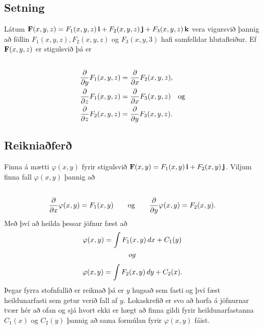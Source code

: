 \documentclass[a4paper,10pt,icelandic]{sphinxmanual}
\begin{document}
\subsection{Setning}
\label{Kafli5:id4}
Látum
\(\mbox{${\bf F}$}(x,y,z)=F_1(x,y,z)\,\mbox{${\bf i}$}+F_2(x,y,z)\,\mbox{${\bf j}$}+F_3(x,y,z)\,\mbox{${\bf k}$}\)
vera vigursvið þannig að föllin \(F_1(x,y,z), F_2(x,y,z)\) og
\(F_3(x,y,3)\) hafi samfelldar hlutafleiður. Ef
\(\mbox{${\bf F}$}(x,y,z)\) er stigulsvið þá er
\begin{gather}
\begin{split}\displaystyle\end{split}\notag\\\begin{split}\begin{aligned}
\frac{\partial}{\partial y}F_1(x,y,z) &=
\frac{\partial}{\partial x}F_2(x,y,z), \\
\frac{\partial}{\partial z}F_1(x,y,z) &=
\frac{\partial}{\partial x}F_3(x,y,z) \quad \text{og} \\
\frac{\partial}{\partial z}F_2(x,y,z)&=
\frac{\partial}{\partial y}F_3(x,y,z).\end{aligned}\end{split}\notag
\end{gather}

\subsection{Reikniaðferð}
\label{Kafli5:reikniafer}
Finna á mætti \(\varphi(x,y)\) fyrir stigulsvið
\(\mbox{${\bf F}$}(x,y)=F_1(x,y)\,\mbox{${\bf i}$}+F_2(x,y)\,\mbox{${\bf j}$}\).
Viljum finna fall \(\varphi(x,y)\) þannig að
\begin{gather}
\begin{split}\displaystyle\end{split}\notag\\\begin{split}\frac{\partial}{\partial x}\varphi(x,y)=F_1(x,y)\qquad
\mbox{og}\qquad \frac{\partial}{\partial y}\varphi(x,y)=F_2(x,y).\end{split}\notag
\end{gather}
Með því að heilda þessar jöfnur fæst að
\begin{gather}
\begin{split}\displaystyle \varphi(x,y)=\int F_1(x,y)\,dx+C_1(y)\end{split}\notag\\\begin{split}og\end{split}\notag
\end{gather}\begin{gather}
\begin{split}\displaystyle \varphi(x,y)=\int F_2(x,y)\,dy+C_2(x).\end{split}\notag
\end{gather}
Þegar fyrra stofnfallið er reiknað þá er \(y\) hugsað sem fasti og
því fæst heildunarfasti sem getur verið fall af \(y\). Lokaskrefið
er svo að horfa á jöfnurnar tvær hér að ofan og sjá hvort ekki er hægt
að finna gildi fyrir heildunarfastanna \(C_1(x)\) og \(C_2(y)\)
þannig að sama formúlan fyrir \(\varphi(x,y)\) fáist.
\end{document}
